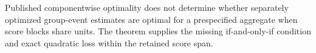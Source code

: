 Published componentwise optimality does not determine whether separately optimized group-event estimates are optimal for a prespecified aggregate when score blocks share units. The theorem supplies the missing if-and-only-if condition and exact quadratic loss within the retained score span.